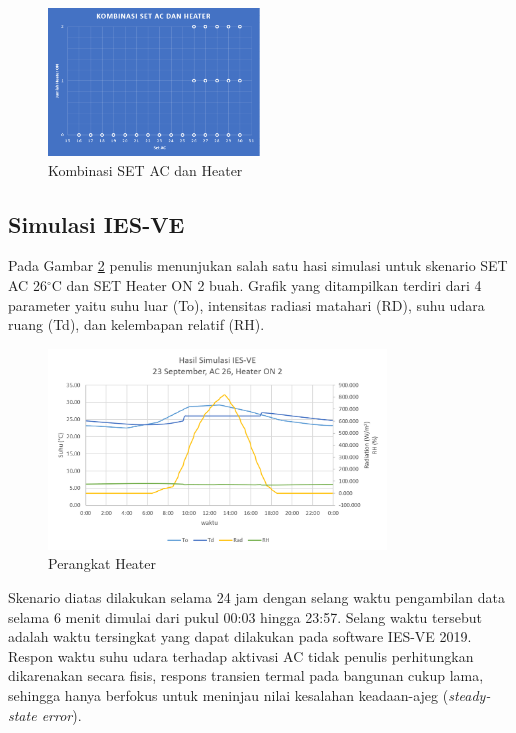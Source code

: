 \begin{figure}[!h]
	\centering
	\includegraphics[width=0.5\textwidth]{figures/HeaterAC}
	\caption{Kombinasi SET AC dan Heater}
	\label{fig:5:HeaterAC}
\end{figure}

\subsection{Simulasi IES-VE}

Pada Gambar \ref{fig:5:SimulasiIESVE} penulis menunjukan salah satu hasi simulasi untuk skenario
SET AC 26$^\circ$C dan SET Heater ON 2 buah. Grafik yang ditampilkan terdiri dari 4
parameter yaitu suhu luar (To), intensitas radiasi matahari (RD), suhu udara ruang (Td), dan kelembapan relatif (RH).

\begin{figure}[!h]
	\centering
	\includegraphics[width=0.8\textwidth]{figures/HasilSimulasiIESVE}
	\caption{Perangkat Heater}
	\label{fig:5:SimulasiIESVE}
\end{figure}

Skenario diatas dilakukan selama 24 jam dengan selang waktu pengambilan data selama 6 menit dimulai dari pukul 00:03 hingga 23:57. Selang waktu tersebut adalah waktu tersingkat yang dapat dilakukan pada software IES-VE 2019. Respon waktu suhu udara terhadap aktivasi AC tidak penulis perhitungkan dikarenakan secara fisis, respons transien termal pada bangunan cukup lama, sehingga hanya berfokus untuk meninjau nilai kesalahan keadaan-ajeg (\textit{steady-state error}).


